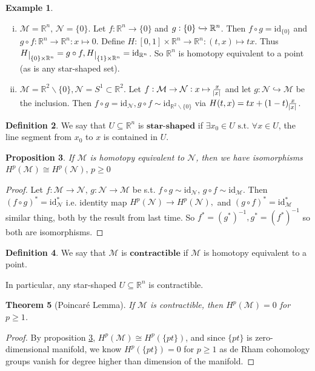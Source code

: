 \documentclass[10pt]{article}
\theoremstyle{plain}
\newtheorem{thm}{Theorem}[section] %
\newtheorem{prop}[thm]{Proposition}
\theoremstyle{definition}
\newtheorem{defn}[thm]{Definition} %
\newtheorem{exmp}[thm]{Example} %
\newcommand{\st}{\text{ s.t. }}
\newcommand{\id}{\text{id}}
\newcommand{\Real}{\mathbb{R}}
\newcommand{\man}{\mathcal{M}}
\newcommand{\nan}{\mathcal{N}}
\def\restrict#1{\raise-.5ex\hbox{\ensuremath|}_{#1}}
\newcommand{\cohomman}[1]{H^{#1}(\man)}
\newcommand{\cohomnan}[1]{H^{#1}(\nan)}
\newcommand{\inter}{\left[0,1\right]}
\newcommand{\mysection}[1]{
    \setcounter{thm}{0}
    \section*{#1}
    \addcontentsline{toc}{section}{#1}
    \addtocounter{section}{1}
    \setcounter{subsection}{0}

}
\begin{document}
\begin{exmp}
\begin{enumerate}[(i)]
    \item $\man = \Real ^n, \, \nan = \{0\}.$ Let $f:\Real^n \to \{0\}$ and $g:\{0\} \xhookrightarrow{} \Real^n$. Then $f\circ g = \id_{\{0\}}$ and $g\circ f : \Real^n \to \Real^n : x \mapsto 0$. Define $H: \inter \times \Real^n \to \Real ^n : (t,x) \mapsto tx$. Thus $H\restrict{\{0\}\times \Real^n} = g\circ f , H\restrict{\{1\}\times \Real^n} = \id_{\Real^n}$. So $\Real^n$ is homotopy equivalent to a point (as is any star-shaped set).
    \item $\man = \Real^2\backslash \{0\}, \nan = S^1 \subset \Real^2$. Let $f: \man \to \nan: x\mapsto \frac{x}{\abs{x}}$ and let $g: \nan \hookrightarrow \man$ be the inclusion. Then $f\circ g = \id_{\nan}, g\circ f \sim \id_{\Real^2\backslash\{0\}}$ via $H(t,x) = tx + (1-t) \frac{x}{\abs{x}}$.
\end{enumerate}
\end{exmp}
\begin{defn}
We say that $U\subseteq \Real^n$ is $\textbf{star-shaped}$ if $\exists x_0 \in U \st \forall x\in U $, the line segment from $x_0$ to $x$ is contained in $U$.
\end{defn}
\begin{prop}\label{prop:homotopyequivalenceimpliescohomologyequivalence}
If $\man $ is homotopy equivalent to $\nan$, then we have isomorphisms $\cohomman{p} \cong \cohomnan{p}, \, p\geq 0$
\end{prop}
\begin{proof}
Let $f: \man \to \nan, \, g:\nan\to \man $ be s.t. $f\circ g \sim \id _{\nan}, \, g\circ f \sim \id_{\man}$. Then $(f\circ g)^* = \id_\nan^*$ i.e. identity map $\cohomnan{p} \to \cohomnan{p},$ and $(g\circ f)^* = \id_\man^*$ similar thing, both by the result from last time. So $f^* = (g^*)^{-1}, g^* = (f^*)^{-1}$ so both are isomorphisms.
\end{proof}
\begin{defn}
We say that $\man$ is $\textbf{contractible}$ if $\man$ is homotopy equivalent to a point.
\end{defn}\noindent
In particular, any star-shaped $U \subseteq \Real^n$ is contractible.
\begin{thm}[Poincaré Lemma]
If $\man$ is contractible, then $\cohomman{p} = 0 $ for $p\geq 1$.
\end{thm}
\begin{proof}
By proposition \ref{prop:homotopyequivalenceimpliescohomologyequivalence}, $\cohomman{p} \cong H^p(\{{pt}\})$, and since $\{pt\}$ is zero-dimensional manifold, we know $H^p(\{pt\}) = 0$ for $p\geq 1$ as de Rham cohomology groups vanish for degree higher than dimension of the manifold.
\end{proof}
\end{document}
